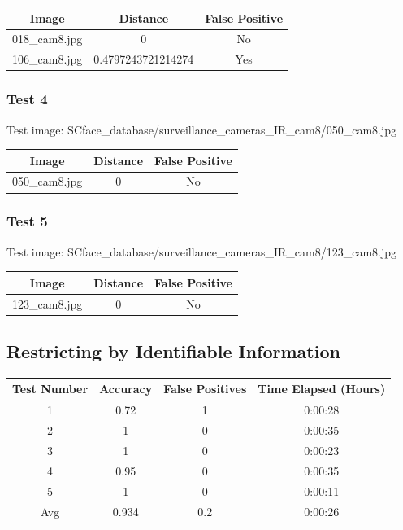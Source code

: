 \documentclass[12pt]{article}
\begin{document}
\begin{center}
\begin{tabular}{ccc}
Image & Distance & False Positive \\
\hline
018\_cam8.jpg & 0 & No \\
106\_cam8.jpg & 0.4797243721214274 & Yes \\
\end{tabular}
\end{center}

\subsubsection{Test 4}
Test image: SCface\_database/surveillance\_cameras\_IR\_cam8/050\_cam8.jpg

\begin{center}
\begin{tabular}{ccc}
Image & Distance & False Positive \\
\hline
050\_cam8.jpg & 0 & No \\
\end{tabular}
\end{center}

\subsubsection{Test 5}
Test image: SCface\_database/surveillance\_cameras\_IR\_cam8/123\_cam8.jpg

\begin{center}
\begin{tabular}{ccc}
Image & Distance & False Positive \\
\hline
123\_cam8.jpg & 0 & No \\
\end{tabular}
\end{center}


\subsection{Restricting by Identifiable Information}
\begin{center}
\begin{tabular}{cccc}
Test Number & Accuracy & False Positives & Time Elapsed (Hours) \\
\hline
1 & 0.72 & 1 & 0:00:28 \\
2 & 1 & 0 & 0:00:35 \\
3 & 1 & 0 & 0:00:23 \\
4 & 0.95 & 0 & 0:00:35 \\
5 & 1 & 0 & 0:00:11\\
Avg & 0.934 & 0.2 &  0:00:26\\ 
\end{tabular}
\end{center}
\end{document}
